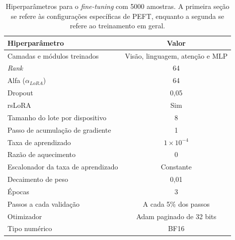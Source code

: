 \begin{table}[ht]
    \caption{\small Hiperparâmetros para o \textit{fine-tuning} com 5000 amostras. A primeira seção se refere às
    configurações específicas de \ac{PEFT}, enquanto a segunda se refere ao treinamento em geral.}
    \centering
    \begin{tabular}{l|c}
        \hline
        Hiperparâmetro                             & Valor                                  \\ \hline
        Camadas e módulos treinados                & Visão, linguagem, atenção e \ac{MLP}   \\
        \textit{Rank}                              & 64                                     \\
        Alfa (\begin{math}\alpha_{LoRA}\end{math}) & 64                                     \\
        Dropout                                    & 0,05                                   \\
        \ac{rsLoRA}                                & Sim                                    \\ \hline
        Tamanho do lote por dispositivo            & 8                                      \\
        Passo de acumulação de gradiente           & 1                                      \\
        Taxa de aprendizado                        & \begin{math}1 \times 10^{-4}\end{math} \\
        Razão de aquecimento                       & 0                                      \\
        Escalonador da taxa de aprendizado         & Constante                              \\
        Decaimento de peso                         & 0,01                                   \\
        Épocas                                     & 3                                      \\
        Passos a cada validação                    & A cada 5\% dos passos                  \\
        Otimizador                                 & \ac{Adam} paginado de 32 bits          \\
        Tipo numérico                              & \ac{BF16}                              \\ \hline
    \end{tabular}
    \label{tab:qlora_5000_config}
\end{table}

